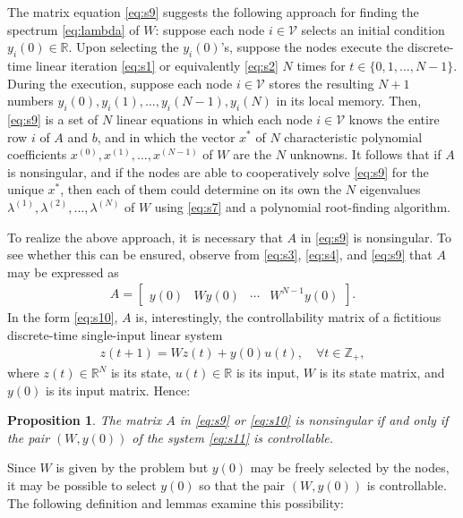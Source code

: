 \documentclass[11pt]{article}
\theoremstyle{plain}
\newtheorem{proposition}{Proposition}
\theoremstyle{definition}
\theoremstyle{remark}
\begin{document}
The matrix equation \eqref{eq:s9} suggests the following approach for finding the spectrum \eqref{eq:lambda} of $W$: suppose each node $i\in\mathcal{V}$ selects an initial condition $y_i(0)\in\mathbb{R}$. Upon selecting the $y_i(0)$'s, suppose the nodes execute the discrete-time linear iteration \eqref{eq:s1} or equivalently \eqref{eq:s2} $N$ times for $t\in\{0,1,\ldots,N-1\}$. During the execution, suppose each node $i\in\mathcal{V}$ stores the resulting $N+1$ numbers $y_i(0),y_i(1),\ldots,y_i(N-1),y_i(N)$ in its local memory. Then, \eqref{eq:s9} is a set of $N$ linear equations in which each node $i\in\mathcal{V}$ knows the entire row $i$ of $A$ and $b$, and in which the vector $x^*$ of $N$ characteristic polynomial coefficients $x^{(0)},x^{(1)},\ldots,x^{(N-1)}$ of $W$ are the $N$ unknowns. It follows that if $A$ is nonsingular, and if the nodes are able to cooperatively solve \eqref{eq:s9} for the unique $x^*$, then each of them could determine on its own the $N$ eigenvalues $\lambda^{(1)},\lambda^{(2)},\ldots,\lambda^{(N)}$ of $W$ using \eqref{eq:s7} and a polynomial root-finding algorithm.

To realize the above approach, it is necessary that $A$ in \eqref{eq:s9} is nonsingular. To see whether this can be ensured, observe from \eqref{eq:s3}, \eqref{eq:s4}, and \eqref{eq:s9} that $A$ may be expressed as
\begin{align}
A=\begin{bmatrix}y(0) & Wy(0) & \cdots & W^{N-1}y(0)\end{bmatrix}.\label{eq:s10}
\end{align}
In the form \eqref{eq:s10}, $A$ is, interestingly, the controllability matrix of a fictitious discrete-time single-input linear system
\begin{align}
z(t+1)=Wz(t)+y(0)u(t),\quad\forall t\in\mathbb{Z}_+,\label{eq:s11}
\end{align}
where $z(t)\in\mathbb{R}^N$ is its state, $u(t)\in\mathbb{R}$ is its input, $W$ is its state matrix, and $y(0)$ is its input matrix. Hence:

\begin{proposition}\label{pro:AWy0}
The matrix $A$ in \eqref{eq:s9} or \eqref{eq:s10} is nonsingular if and only if the pair $(W,y(0))$ of the system \eqref{eq:s11} is controllable.
\end{proposition}

Since $W$ is given by the problem but $y(0)$ may be freely selected by the nodes, it may be possible to select $y(0)$ so that the pair $(W,y(0))$ is controllable. The following definition and lemmas examine this possibility:
\end{document}
